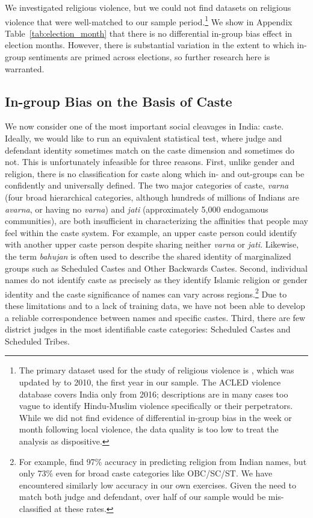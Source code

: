 \documentclass[12pt,english]{article}
\begin{document}
We investigated religious violence, but we could not find datasets on religious violence that were well-matched to our sample period.\footnote{The primary dataset used for the study of religious violence is \citet{varshney2006}, which was updated by \citet{bhalotra2012} to 2010, the first year in our sample. The ACLED violence database covers India only from 2016; descriptions are in many cases too vague to identify Hindu-Muslim violence specifically or their perpetrators. While we did not find evidence of differential in-group bias in the week or month following local violence, the data quality is too low to treat the analysis as dispositive.} We show in Appendix Table~\ref{tab:election_month} that there is no differential in-group bias effect in election months. However, there is substantial variation in the extent to which in-group sentiments are primed across elections, so further research here is warranted.

\subsection{In-group Bias on the Basis of Caste}

We now consider one of the most important social cleavages in India: caste. Ideally, we would like to run an equivalent statistical test, where judge and defendant identity sometimes match on the caste dimension and sometimes do not. This is unfortunately infeasible for three reasons. First, unlike gender and religion, there is no classification for caste along which in- and out-groups can be confidently and universally defined. The two major categories of caste, \textit{varna} (four broad hierarchical categories, although hundreds of millions of Indians are \textit{avarna}, or having no \textit{varna}) and \textit{jati} (approximately 5,000 endogamous communities), are both insufficient in characterizing the affinities that people may feel within the caste system. For example, an upper caste person could identify with another upper caste person despite sharing neither \textit{varna} or \textit{jati}. Likewise, the term \textit{bahujan} is often used to describe the shared identity of marginalized groups such as Scheduled Castes and Other Backwards Castes. Second, individual names do not identify caste as precisely as they identify Islamic religion or gender identity and the caste significance of names can vary across regions.\footnote{For example, \citet{vahini2022} find 97\% accuracy in predicting religion from Indian names, but only 73\% even for broad caste categories like OBC/SC/ST. We have encountered similarly low accuracy in our own exercises. Given the need to match both judge and defendant, over half of our sample would be mis-classified at these rates.} Due to these limitations and to a lack of training data, we have not been able to develop a reliable correspondence between names and specific castes. Third, there are few district judges in the most identifiable caste categories: Scheduled Castes and Scheduled Tribes.
\end{document}
